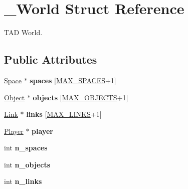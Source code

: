 \hypertarget{struct___world}{\section{\-\_\-\-World Struct Reference}
\label{struct___world}
}


T\-A\-D World.  


\subsection*{Public Attributes}
\begin{DoxyCompactItemize}
\item 
\hypertarget{struct___world_a9ed563604df72c6f353b3383d3a5bf0d}{\hyperlink{_space_8h_a67533ffc2b70463baecc38fb0629bbfc}{Space} $\ast$ {\bfseries spaces} \mbox{[}\hyperlink{_types_8h_a5f54fd55f983a2e33ce076cd9f587e82}{M\-A\-X\-\_\-\-S\-P\-A\-C\-E\-S}+1\mbox{]}}\label{struct___world_a9ed563604df72c6f353b3383d3a5bf0d}

\item 
\hypertarget{struct___world_a68f41cc364f137e1aa98384c1a9351b2}{\hyperlink{_object_8h_a7f8bbcda919b65ce67f92fba08e0212f}{Object} $\ast$ {\bfseries objects} \mbox{[}\hyperlink{_types_8h_acdc7844fbd4d45737d4aa56834d37829}{M\-A\-X\-\_\-\-O\-B\-J\-E\-C\-T\-S}+1\mbox{]}}\label{struct___world_a68f41cc364f137e1aa98384c1a9351b2}

\item 
\hypertarget{struct___world_aefb1cc163e7bfc82751dd2d5764d5a23}{\hyperlink{_link_8h_ae3b299941e67be6971bfd64a25505eff}{Link} $\ast$ {\bfseries links} \mbox{[}\hyperlink{_types_8h_a660ed1ec8604982002a0d6eced0e0367}{M\-A\-X\-\_\-\-L\-I\-N\-K\-S}+1\mbox{]}}\label{struct___world_aefb1cc163e7bfc82751dd2d5764d5a23}

\item 
\hypertarget{struct___world_addb4bfc17a52aa60dcb044f029c54120}{\hyperlink{struct___player}{Player} $\ast$ {\bfseries player}}\label{struct___world_addb4bfc17a52aa60dcb044f029c54120}

\item 
\hypertarget{struct___world_af1096c2f3ebc5de569d6de790a20fcb5}{int {\bfseries n\-\_\-spaces}}\label{struct___world_af1096c2f3ebc5de569d6de790a20fcb5}

\item 
\hypertarget{struct___world_a52fb5bd7179f03f630dae14353f229bb}{int {\bfseries n\-\_\-objects}}\label{struct___world_a52fb5bd7179f03f630dae14353f229bb}

\item 
\hypertarget{struct___world_a3fa7359ad098e55d12d8d79827986e68}{int {\bfseries n\-\_\-links}}\label{struct___world_a3fa7359ad098e55d12d8d79827986e68}

\end{DoxyCompactItemize}


